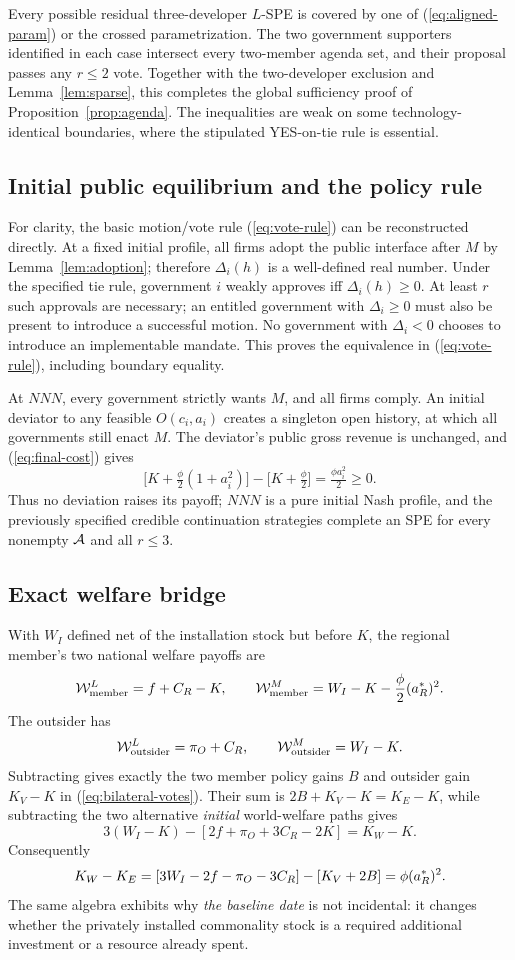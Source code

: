 Every possible residual three-developer \(L\)-SPE is covered by one of (\ref{eq:aligned-param}) or the crossed parametrization. The two government supporters identified in each case intersect every two-member agenda set, and their proposal passes any \(r\le2\) vote. Together with the two-developer exclusion and Lemma~\ref{lem:sparse}, this completes the global sufficiency proof of Proposition~\ref{prop:agenda}. The inequalities are weak on some technology-identical boundaries, where the stipulated YES-on-tie rule is essential.

\subsection{Initial public equilibrium and the policy rule}\label{app:continuation}

For clarity, the basic motion/vote rule (\ref{eq:vote-rule}) can be reconstructed directly. At a fixed initial profile, all firms adopt the public interface after \(M\) by Lemma~\ref{lem:adoption}; therefore \(\Delta_i(h)\) is a well-defined real number. Under the specified tie rule, government \(i\) weakly approves iff \(\Delta_i(h)\ge0\). At least \(r\) such approvals are necessary; an entitled government with \(\Delta_i\ge0\) must also be present to introduce a successful motion. No government with \(\Delta_i<0\) chooses to introduce an implementable mandate. This proves the equivalence in (\ref{eq:vote-rule}), including boundary equality.

At \(NNN\), every government strictly wants \(M\), and all firms comply. An initial deviator to any feasible \(O(c_i,a_i)\) creates a singleton open history, at which all governments still enact \(M\). The deviator's public gross revenue is unchanged, and (\ref{eq:final-cost}) gives
\[
 \bigl[K+\tfrac{\phi}{2}(1+a_i^2)\bigr]
 -\bigl[K+\tfrac{\phi}{2}\bigr]
 =\tfrac{\phi a_i^2}{2}\ge0.
\]
Thus no deviation raises its payoff; \(NNN\) is a pure initial Nash profile, and the previously specified credible continuation strategies complete an SPE for every nonempty \(\mathcal{A}\) and all \(r\le3\).

\subsection{Exact welfare bridge}\label{app:thresholds}

With \(W_I\) defined net of the installation stock but before \(K\), the regional member's two national welfare payoffs are
\[
 \mathcal W_{\rm member}^{L}=f+C_R-K,\qquad
 \mathcal W_{\rm member}^{M}
 =W_I-K-\frac{\phi}{2}(a_R^*)^2.
\]
The outsider has
\[
 \mathcal W_{\rm outsider}^{L}=\pi_O+C_R,\qquad
 \mathcal W_{\rm outsider}^{M}=W_I-K.
\]
Subtracting gives exactly the two member policy gains \(B\) and outsider gain \(K_V-K\) in (\ref{eq:bilateral-votes}). Their sum is \(2B+K_V-K=K_E-K\), while subtracting the two alternative \emph{initial} world-welfare paths gives
\[
 3(W_I-K)-[2f+\pi_O+3C_R-2K]
 =K_W-K.
\]
Consequently
\[
 K_W-K_E
 =[3W_I-2f-\pi_O-3C_R]
 -[K_V+2B]
 =\phi(a_R^*)^2.
\]
The same algebra exhibits why \emph{the baseline date} is not incidental: it changes whether the privately installed commonality stock is a required additional investment or a resource already spent.
